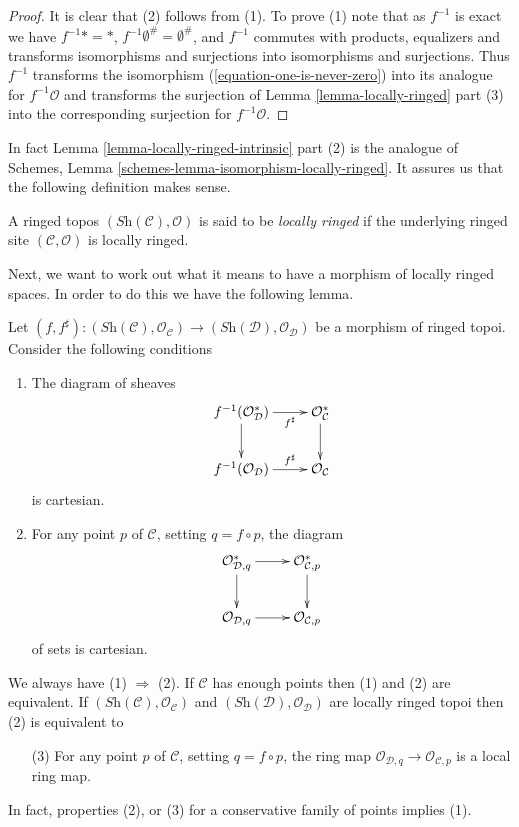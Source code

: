 \begin{proof}
It is clear that (2) follows from (1). To prove (1) note that
as $f^{-1}$ is exact we have $f^{-1}* = *$,
$f^{-1}\emptyset^\# = \emptyset^\#$, and $f^{-1}$ commutes with
products, equalizers and transforms isomorphisms and surjections
into isomorphisms and surjections. Thus $f^{-1}$ transforms the
isomorphism (\ref{equation-one-is-never-zero}) into
its analogue for $f^{-1}\mathcal{O}$ and transforms the surjection of
Lemma \ref{lemma-locally-ringed} part (3)
into the corresponding surjection for $f^{-1}\mathcal{O}$.
\end{proof}

\noindent
In fact
Lemma \ref{lemma-locally-ringed-intrinsic} part (2)
is the analogue of
Schemes, Lemma \ref{schemes-lemma-isomorphism-locally-ringed}.
It assures us that the following definition makes sense.

\begin{definition}
\label{definition-locally-ringed-topos}
A ringed topos $(\textit{Sh}(\mathcal{C}), \mathcal{O})$ is said to be
{\it locally ringed} if the underlying ringed site
$(\mathcal{C}, \mathcal{O})$ is locally ringed.
\end{definition}

\noindent
Next, we want to work out what it means to have a morphism of locally ringed
spaces. In order to do this we have the following lemma.

\begin{lemma}
\label{lemma-locally-ringed-morphism}
Let
$(f, f^\sharp) : (\textit{Sh}(\mathcal{C}), \mathcal{O}_{\mathcal{C}})
\to (\textit{Sh}(\mathcal{D}), \mathcal{O}_{\mathcal{D}})$
be a morphism of ringed topoi.
Consider the following conditions
\begin{enumerate}
\item The diagram of sheaves
$$
\xymatrix{
f^{-1}(\mathcal{O}^*_{\mathcal{D}}) \ar[r]_-{f^\sharp} \ar[d] &
\mathcal{O}^*_{\mathcal{C}} \ar[d] \\
f^{-1}(\mathcal{O}_{\mathcal{D}}) \ar[r]^-{f^\sharp} &
\mathcal{O}_{\mathcal{C}}
}
$$
is cartesian.
\item For any point $p$ of $\mathcal{C}$, setting $q = f \circ p$,
the diagram
$$
\xymatrix{
\mathcal{O}^*_{\mathcal{D}, q} \ar[r] \ar[d] &
\mathcal{O}^*_{\mathcal{C}, p} \ar[d] \\
\mathcal{O}_{\mathcal{D}, q} \ar[r] &
\mathcal{O}_{\mathcal{C}, p}
}
$$
of sets is cartesian.
\end{enumerate}
We always have (1) $\Rightarrow$ (2). If $\mathcal{C}$ has enough points
then (1) and (2) are equivalent. If
$(\textit{Sh}(\mathcal{C}), \mathcal{O}_{\mathcal{C}})$
and
$(\textit{Sh}(\mathcal{D}), \mathcal{O}_{\mathcal{D}})$
are locally ringed topoi then (2) is equivalent to
\begin{enumerate}
\item[(3)] For any point $p$ of $\mathcal{C}$, setting $q = f \circ p$,
the ring map $\mathcal{O}_{\mathcal{D}, q} \to \mathcal{O}_{\mathcal{C}, p}$
is a local ring map.
\end{enumerate}
In fact, properties (2), or (3) for a conservative
family of points implies (1).
\end{lemma}

